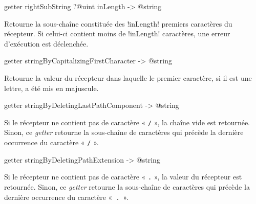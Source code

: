 \begin{galgasbox}
getter rightSubString ?@uint inLength -> @string
\end{galgasbox}

Retourne la sous-chaîne constituée des \ggs!inLength! premiers caractères du récepteur. Si celui-ci contient moins de \ggs!inLength! caractères, une erreur d'exécution est déclenchée.









\begin{galgasbox}
getter stringByCapitalizingFirstCharacter -> @string
\end{galgasbox}

Retourne la valeur du récepteur dans laquelle le premier caractère, si il est une lettre, a été mis en majuscule.









\begin{galgasbox}
getter stringByDeletingLastPathComponent -> @string
\end{galgasbox}

Si le récepteur ne contient pas de caractère « \texttt{/} », la chaîne vide est retournée. Sinon, ce \emph{getter} retourne la sous-chaîne de caractères qui précède la dernière occurrence du caractère « \texttt{/} ».










\begin{galgasbox}
getter stringByDeletingPathExtension -> @string
\end{galgasbox}

Si le récepteur ne contient pas de caractère « \texttt{.} », la valeur du récepteur est retournée. Sinon, ce \emph{getter} retourne la sous-chaîne de caractères qui précède la dernière occurrence du caractère «~\texttt{.}~».









